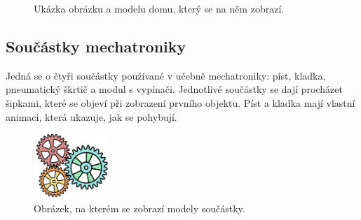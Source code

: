 \documentclass[12pt, a4paper,
twoside,        %
openright
]{report}
\begin{document}
\begin{figure}[H]
	\centering
	\qquad
	\caption{Ukázka obrázku a modelu domu, který se na něm zobrazí.}
	\label{fig:house}
\end{figure}

\newpage

\subsection{Součástky mechatroniky}	
Jedná se o čtyři součástky používané v učebně mechatroniky: píst, kladka, pneumatický škrtič a modul s vypínači.
Jednotlivé součástky se dají procházet šipkami, které se objeví při zobrazení prvního objektu. Píst a kladka mají vlastní animaci, která ukazuje, jak se pohybují. 


\begin{figure}[H]
	\centering 
	\includegraphics[width=0.25\textwidth]{image/mechatronika.png} 
	\caption{Obrázek, na kterém se zobrazí modely součástky.} 
	\label{fig:mechatronika_obrazek} 
\end{figure}
\end{document}
